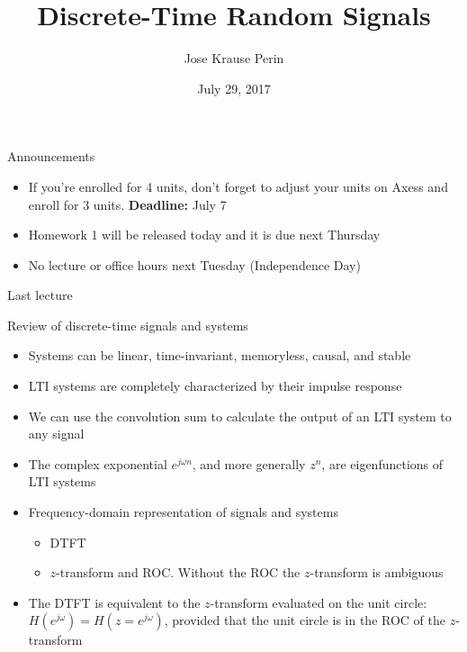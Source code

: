 \documentclass[10pt, handout]{beamer}
\title[EE 264]{Discrete-Time Random Signals}
\author{Jose Krause Perin}
\institute{Stanford University}
\date{July 29, 2017}
\begin{document}
\begin{frame}
  \titlepage
\end{frame}


\begin{frame}{Announcements}

\begin{itemize}
	\item If you're enrolled for 4 units, don't forget to adjust your units on Axess and enroll for 3 units. \textbf{Deadline:} July 7
	\item Homework 1 will be released today and it is due next Thursday
	\item No lecture or office hours next Tuesday (Independence Day)
\end{itemize}

\end{frame}

\begin{frame}{Last lecture}

\begin{block}{Review of discrete-time signals and systems}
	\begin{itemize}
		\item Systems can be linear, time-invariant, memoryless, causal, and stable \\
		\item LTI systems are completely characterized by their impulse response \\
		\item We can use the convolution sum to calculate the output of an LTI system to any signal \\
		\item The complex exponential $e^{j\omega n}$, and more generally $z^n$, are eigenfunctions of LTI systems
		\item Frequency-domain representation of signals and systems
		\begin{itemize}
			\item DTFT
			\item $z$-transform and ROC. Without the ROC the $z$-transform is ambiguous
		\end{itemize}
		\item The DTFT is equivalent to the $z$-transform evaluated on the unit circle: $H(e^{j\omega}) = H(z = e^{j\omega})$, provided that the unit circle is in the ROC of the $z$-transform
	\end{itemize}
\end{block}

\end{frame}
\end{document}
